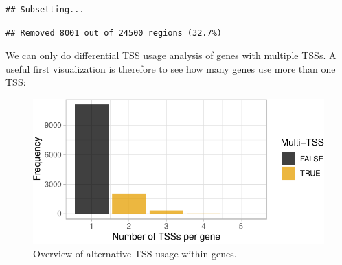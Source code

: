 \documentclass[9pt,a4paper,]{extarticle}
\newenvironment{Shaded}{\begin{snugshade}}{\end{snugshade}}
\newcommand{\KeywordTok}[1]{\textcolor[rgb]{0.13,0.29,0.53}{\textbf{{#1}}}}
\newcommand{\DataTypeTok}[1]{\textcolor[rgb]{0.13,0.29,0.53}{{#1}}}
\newcommand{\DecValTok}[1]{\textcolor[rgb]{0.00,0.00,0.81}{{#1}}}
\newcommand{\FloatTok}[1]{\textcolor[rgb]{0.00,0.00,0.81}{{#1}}}
\newcommand{\StringTok}[1]{\textcolor[rgb]{0.31,0.60,0.02}{{#1}}}
\newcommand{\NormalTok}[1]{{#1}}
\begin{document}
\begin{verbatim}
## Subsetting...
\end{verbatim}

\begin{verbatim}
## Removed 8001 out of 24500 regions (32.7%)
\end{verbatim}

We can only do differential TSS usage analysis of genes with multiple TSSs. A useful first visualization is therefore to see how many genes use more than one TSS:

\begin{Shaded}
\end{Shaded}

\begin{figure}

{\centering \includegraphics{CAGEWorkflow_files/figure-latex/TSSstructure-1} 

}

\caption{Overview of alternative TSS usage within genes.}\label{fig:TSSstructure}
\end{figure}
\end{document}
